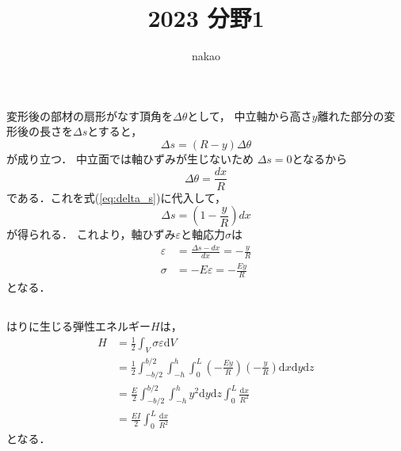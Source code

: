 \documentclass[a4paper]{jsarticle}
\begin{document}
\title{2023 分野1}
\author{nakao}
\maketitle

\section{}
\subsection{}
変形後の部材の扇形がなす頂角を$\Delta \theta$として，
中立軸から高さ$y$離れた部分の変形後の長さを$\Delta s$とすると，
\begin{equation}
  \label{eq:delta_s}
  \Delta s = (R - y) \Delta \theta
\end{equation}
が成り立つ．
中立面では軸ひずみが生じないため
$\Delta s = 0$となるから
\begin{equation}
  \Delta \theta = \frac{dx}{R}
\end{equation}
である．これを式(\ref{eq:delta_s})に代入して，
\begin{equation}
  \Delta s = \left(1 - \frac{y}{R}\right) dx
\end{equation}
が得られる．
これより，軸ひずみ$\varepsilon$と軸応力$\sigma$は
\begin{align}
  \varepsilon & = \frac{\Delta s - dx}{dx} = -\frac{y}{R} \\
  \sigma      & = -E \varepsilon = - \frac{E y}{R}
\end{align}
となる．

\subsection{}
はりに生じる弾性エネルギー$H$は，
\begin{equation}
  \begin{aligned}
    H & = \frac{1}{2} \int_V \sigma \varepsilon \mathrm{d} V    \\
      & = \frac{1}{2} \int_{-b/2}^{b/2} \int_{-h}^h \int_0^L
    \left(-\frac{E y}{R}\right) \left(-\frac{y}{R}\right)
    \mathrm{d} x \mathrm{d} y \mathrm{d} z                      \\
      & = \frac{E}{2} \int_{-b/2}^{b/2} \int_{-h}^h y^2
    \mathrm{d} y \mathrm{d} z \int_0^L \frac{\mathrm{d} x}{R^2} \\
      & = \frac{E I}{2} \int_0^L \frac{\mathrm{d} x}{R^2}
  \end{aligned}
\end{equation}
となる．
\end{document}
